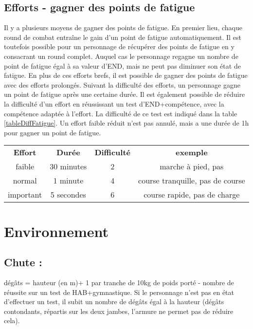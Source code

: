 \documentclass[10pt,a4paper,twocolumn]{book}
\begin{document}
\subsection*{Efforts - gagner des points de fatigue}
Il y a plusieurs moyens de gagner des points de fatigue.
En premier lieu, chaque round de combat entraîne le gain d’un point de fatigue automatiquement. Il est toutefois possible pour un personnage de récupérer des points de fatigue en y consacrant un round complet. Auquel cas le personnage regagne un nombre de point de fatigue égal à sa valeur d’END, mais ne peut pas diminuer son état de fatigue.
En plus de ces efforts brefs, il est possible de gagner des points de fatigue avec des efforts prolongés.
Suivant la difficulté des efforts, un personnage gagne un point de fatigue après une certaine durée. Il est également possible de réduire la difficulté d’un effort en réussissant un test d’END+compétence, avec la compétence adaptée à l’effort. La difficulté de ce test est indiqué dans la table \ref{tableDiffFatigue}. Un effort faible réduit n’est pas annulé, mais a une durée de 1h pour gagner un point de fatigue.
\begin{table*}
\caption{ Réduire un effort :}
\label{tableDiffFatigue}
\begin{center}
\begin{tabular}{cccc}
\textbf{Effort} & \textbf{Durée} & \textbf{Difficulté} &\textbf{exemple} \\
   faible & 30 minutes & 2  & marche à pied, pas\\
   normal & 1 minute & 4  & course tranquille, pas de course\\
   important & 5 secondes & 6 & course rapide, pas de charge\\
\end{tabular}
\end{center}
\end{table*}

\section{Environnement}
\subsection*{Chute :}
dégâts = hauteur (en m)+ 1 par tranche de 10kg de poids porté - nombre de réussite sur un test de HAB+gymnastique. Si le personnage n’est pas en état d’effectuer un test, il subit un nombre de dégâts égal à la hauteur (dégâts contondants, répartis sur les deux jambes, l'armure ne permet pas de réduire cela).
\end{document}
